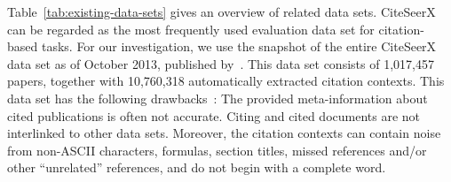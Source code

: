 Table~\ref{tab:existing-data-sets} gives an overview of related data sets.
CiteSeerX can be regarded as the most frequently used evaluation data set for citation-based tasks.
For our investigation, we use the snapshot of the entire CiteSeerX data set as of October 2013, published by~\cite{Huang2015fixed}. This data set consists of 1,017,457 papers, together with 10,760,318 automatically extracted citation contexts.
This data set has the following drawbacks~\cite{Roy2016fixed,Faerber2018LREC}: The provided meta-information about cited publications is often not accurate. Citing and cited documents are not interlinked to other data sets. Moreover, the citation contexts can contain noise from non-ASCII characters, formulas, section titles, missed references and/or other ``unrelated'' references, and do not begin with a complete word.

